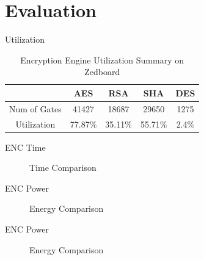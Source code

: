 \documentclass[t]{beamer}
\begin{document}
\section{Evaluation}
\begin{frame}{Utilization}
	\begin{table}[ht!]
		\begin{center}
			\begin{tabular}{c c c c c}
			   & AES & RSA & SHA & DES \\
			   \hline
			   Num of Gates & 41427     & 18687     & 29650     & 1275 \\
			   Utilization  & 77.87$\%$ & 35.11$\%$ & 55.71$\%$ & 2.4$\%$ 
			\end{tabular}
			\caption{Encryption Engine Utilization Summary on Zedboard}
			\label{table:gates}
		\end{center}
	\end{table}
\end{frame}

\begin{frame}{ENC Time}
	\begin{figure}
		\begin{center}
		\end{center}
		\caption{Time Comparison}
		\label{fig:time}
	\end{figure}
\end{frame}

\begin{frame}{ENC Power}
	\begin{figure}
		\begin{center}
		\end{center}
		\caption{Energy Comparison}
		\label{fig:power}
	\end{figure}
\end{frame}

\begin{frame}{ENC Power}
	\begin{figure}
		\begin{center}
		\end{center}
		\caption{Energy Comparison}
		\label{fig:power}
	\end{figure}
\end{frame}
\end{document}
